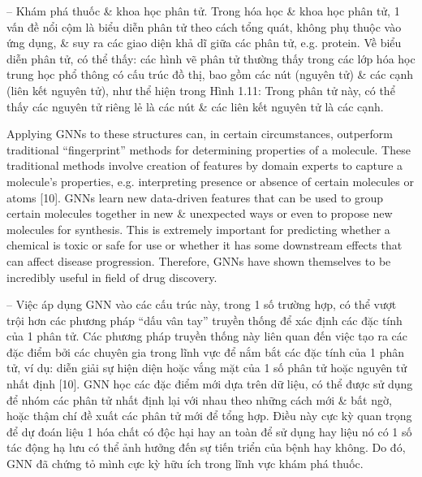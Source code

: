 \documentclass{article}
\begin{document}
\begin{itemize}
\begin{itemize}
\begin{itemize}
            -- {\sf Khám phá thuốc \& khoa học phân tử.} Trong hóa học \& khoa học phân tử, 1 vấn đề nổi cộm là biểu diễn phân tử theo cách tổng quát, không phụ thuộc vào ứng dụng, \& suy ra các giao diện khả dĩ giữa các phân tử, e.g. protein. Về biểu diễn phân tử, có thể thấy: các hình vẽ phân tử thường thấy trong các lớp hóa học trung học phổ thông có cấu trúc đồ thị, bao gồm các nút (nguyên tử) \& các cạnh (liên kết nguyên tử), như thể hiện trong {\sf Hình 1.11: Trong phân tử này, có thể thấy các nguyên tử riêng lẻ là các nút \& các liên kết nguyên tử là các cạnh.}

            Applying GNNs to these structures can, in certain circumstances, outperform traditional ``fingerprint'' methods for determining properties of a molecule. These traditional methods involve creation of features by domain experts to capture a molecule's properties, e.g. interpreting presence or absence of certain molecules or atoms [10]. GNNs learn new data-driven features that can be used to group certain molecules together in new \& unexpected ways or even to propose new molecules for synthesis. This is extremely important for predicting whether a chemical is toxic or safe for use or whether it has some downstream effects that can affect disease progression. Therefore, GNNs have shown themselves to be incredibly useful in field of drug discovery.

            -- Việc áp dụng GNN vào các cấu trúc này, trong 1 số trường hợp, có thể vượt trội hơn các phương pháp ``dấu vân tay'' truyền thống để xác định các đặc tính của 1 phân tử. Các phương pháp truyền thống này liên quan đến việc tạo ra các đặc điểm bởi các chuyên gia trong lĩnh vực để nắm bắt các đặc tính của 1 phân tử, ví dụ: diễn giải sự hiện diện hoặc vắng mặt của 1 số phân tử hoặc nguyên tử nhất định [10]. GNN học các đặc điểm mới dựa trên dữ liệu, có thể được sử dụng để nhóm các phân tử nhất định lại với nhau theo những cách mới \& bất ngờ, hoặc thậm chí đề xuất các phân tử mới để tổng hợp. Điều này cực kỳ quan trọng để dự đoán liệu 1 hóa chất có độc hại hay an toàn để sử dụng hay liệu nó có 1 số tác động hạ lưu có thể ảnh hưởng đến sự tiến triển của bệnh hay không. Do đó, GNN đã chứng tỏ mình cực kỳ hữu ích trong lĩnh vực khám phá thuốc.


\end{itemize}
\end{itemize}
\end{itemize}
\end{document}
